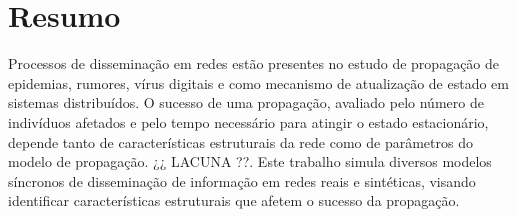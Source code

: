 \chapter*{Resumo}

\noindent{} Processos de disseminação em redes estão presentes no estudo de propagação de epidemias, rumores, 
vírus digitais e como mecanismo de atualização de estado em sistemas distribuídos. O sucesso de uma propagação, 
avaliado pelo número de indivíduos afetados e pelo tempo necessário para atingir o estado estacionário,
depende tanto de características estruturais da rede como de parâmetros do modelo de propagação. ¿¿ LACUNA ??. 
Este trabalho simula diversos modelos síncronos de disseminação de informação em redes reais e sintéticas, 
visando identificar características estruturais que afetem o sucesso da propagação. 
